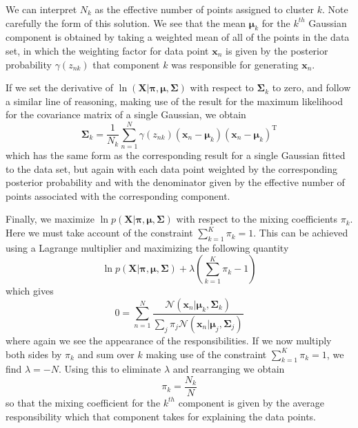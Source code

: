 ﻿\documentclass[a4paper, 11pt]{article}
\numberwithin{equation}{subsection}
\begin{document}
We can interpret $N_k$ as the effective number of points assigned to cluster $k$. Note carefully the form of this solution. We see that the mean $\boldsymbol\mu_k$ for the $k^{th}$ Gaussian component is obtained by taking a weighted mean of all of the points in the data set, in which the weighting factor for data point $\mathbf x_n$ is given by the posterior probability $\gamma(z_{nk})$ that component $k$ was responsible for generating $\mathbf x_n$.

If we set the derivative of $\ln(\mathbf X|\boldsymbol\pi,\boldsymbol\mu,\boldsymbol\Sigma)$ with respect to $\boldsymbol\Sigma_k$ to zero, and follow a similar line of reasoning, making use of the result for the maximum likelihood for the covariance matrix of a single Gaussian, we obtain
\begin{equation}
\boldsymbol\Sigma_k=\frac{1}{N_k}\sum^N_{n=1}\gamma(z_{nk})(\mathbf x_n-\boldsymbol\mu_k)(\mathbf x_n-\boldsymbol\mu_k)^{\mathrm T}
\end{equation}
which has the same form as the corresponding result for a single Gaussian fitted to the data set, but again with each data point weighted by the corresponding posterior
probability and with the denominator given by the effective number of points associated with the corresponding component.

Finally, we maximize $\ln p(\mathbf X|\boldsymbol\pi,\boldsymbol\mu,\boldsymbol\Sigma)$ with respect to the mixing coefficients $\pi_k$. Here we must take account of the constraint $\sum_{k=1}^K\pi_k=1$. This can be achieved using a Lagrange multiplier and maximizing the following quantity
\begin{equation}
\ln p(\mathbf X|\boldsymbol\pi,\boldsymbol\mu,\boldsymbol\Sigma)+\lambda(\sum_{k=1}^K\pi_k-1)
\end{equation}
which gives
\begin{equation}
0=\sum_{n=1}^N\frac{\mathcal N(\mathbf x_n|\boldsymbol\mu_k,\boldsymbol\Sigma_k)}{\sum_j\pi_j\mathcal N(\mathbf x_n|\boldsymbol\mu_j,\boldsymbol\Sigma_j)}
\end{equation}
where again we see the appearance of the responsibilities. If we now multiply both sides by $\pi_k$ and sum over $k$ making use of the constraint $\sum_{k=1}^K\pi_k=1$, we find $\lambda=-N$. Using this to eliminate $\lambda$ and rearranging we obtain
\begin{equation}
\pi_k=\frac{N_k}{N}
\end{equation}
so that the mixing coefficient for the $k^{th}$ component is given by the average responsibility which that component takes for explaining the data points.
\end{document}
